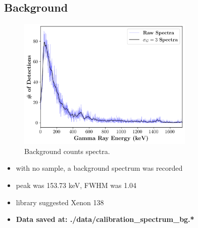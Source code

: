 \documentclass[a4paper]{article}
\begin{document}
\subsection{Background}
\begin{figure}[H]
    \centering
    \includegraphics[width=0.75\textwidth]{figures/background_counts_overlay.png}
    \caption{Background counts spectra.}
\end{figure}
\begin{itemize}
    \item with no sample, a background spectrum was recorded
    \item peak was 153.73 keV, FWHM was 1.04
    \item library suggested Xenon 138
    \item \textbf{Data saved at: ./data/calibration\_spectrum\_bg.*}
\end{itemize}
\end{document}
